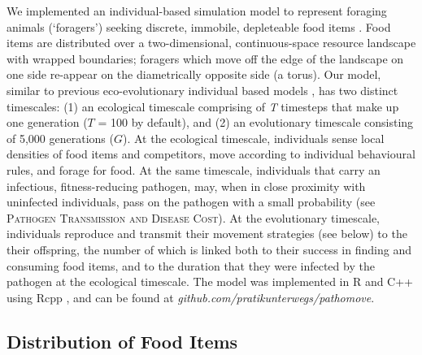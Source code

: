 We implemented an individual-based simulation model to represent foraging animals (`foragers') seeking discrete, immobile, depleteable food items \citep[as in][]{spiegel2017,gupte2021a}.
Food items are distributed over a two-dimensional, continuous-space resource landscape with wrapped boundaries; foragers which move off the edge of the landscape on one side re-appear on the diametrically opposite side (a torus).
Our model, similar to previous eco-evolutionary individual based models \citep{getz2015, netz2021a, gupte2021a}, has two distinct timescales: (1) an ecological timescale comprising of \textit{T} timesteps that make up one generation ($T$ = 100 by default), and (2) an evolutionary timescale consisting of 5,000 generations ($G$).
At the ecological timescale, individuals sense local densities of food items and competitors, move according to individual behavioural rules, and forage for food.
At the same timescale, individuals that carry an infectious, fitness-reducing pathogen, may, when in close proximity with uninfected individuals, pass on the pathogen with a small probability (see \textsc{Pathogen Transmission and Disease Cost}).
At the evolutionary timescale, individuals reproduce and transmit their movement strategies (see below) to the their offspring, the number of which is linked both to their success in finding and consuming food items, and to the duration that they were infected by the pathogen at the ecological timescale.
The model was implemented in R and C++ using Rcpp \citep{rcoreteam2020,eddelbuettel2013}, and can be found at \textit{github.com/pratikunterwegs/pathomove}.

\subsection*{Distribution of Food Items}


